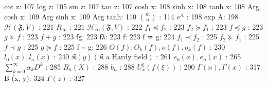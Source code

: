 cot z: 107 log z: 105 sin z: 107 tan z: 107 cosh x: 108 sinh x: 108 tanh x: 108 Arg cosh x: 109 Arg sinh x: 109 Arg tanh: 110 \(\binom{m}{n}\) : 114 \(e^{A}\) : 198 exp A: 198 \(\mathcal{H}(\mathfrak{F}, V)\) : 221 \(R_{\infty}\) : 221 \(\mathcal{H}_{\infty}(\mathfrak{F}, V)\) : 222 \(f_{1} \preccurlyeq f_{2}\) : 223 \(f_{2} \succcurlyeq f_{1}\) : 223 \(f \preccurlyeq g\) : 223 \(g \succcurlyeq f\) : 223 \(f + g\) : 223 fg: 223 fλ: 223 \textbar\textbar f\textbar\textbar: 223 f ≃ g: 224 \(f_{1} \prec f_{2}\) : 225 \(f_{2} \succcurlyeq f_{1}\) : 225 \(f \prec g\) : 225 \(g \succcurlyeq f\) : 225 f \textasciitilde{} g: 226 \(O(f), O_{k}(f), o(f), o_{k}(f)\) : 230 \(l_{0}(x), l_{n}(x)\) : 240 \(\mathfrak{K}(y) (\mathfrak{K} \text{ a Hardy field})\) : 261 \(e_{0}(x), e_{n}(x)\) : 265 \(\sum_{k=0}^{\infty} \alpha_{k} D^{k}\) : 285 \(B_{n}(X)\) : 288 \(b_{n}\) : 288 \(U_{x}^{\xi}(f(\xi))\) : 290 \(\Gamma(n), \Gamma(x)\) : 317 B (x, y): 324 \(\Gamma(z)\) : 327

